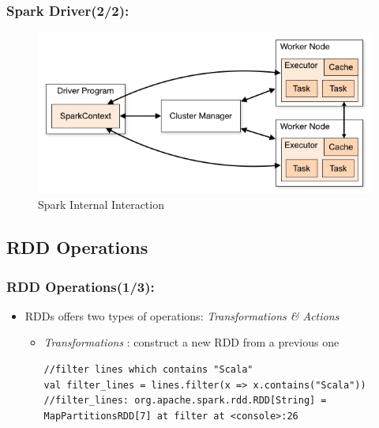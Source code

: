 %
%
%


\begin{frame}
  \frametitle{Spark Driver(2/2):}
  \begin{figure}
  	  \caption{Spark Internal Interaction}  	
	   \includegraphics[width=\textwidth]{Graphics/Spark_Driver_Issue.PNG}
\end{figure}

\end{frame}


%
%
%

\subsection{RDD Operations}

\begin{frame}[fragile]
  \frametitle{RDD Operations(1/3):}
	\begin{itemize}[<+->]
		\item RDDs offers two types of operations: \textit{Transformations \& Actions}
			\begin{itemize}		
					\item \textit{Transformations} : construct a new RDD from a previous one
						\begin{lstlisting}[style=myScalastyle, caption=RDD Transformations Example 1]
//filter lines which contains "Scala"
val filter_lines = lines.filter(x => x.contains("Scala"))
//filter_lines: org.apache.spark.rdd.RDD[String] = MapPartitionsRDD[7] at filter at <console>:26
						\end{lstlisting}
			\end{itemize}
	\end{itemize}
\end{frame}

